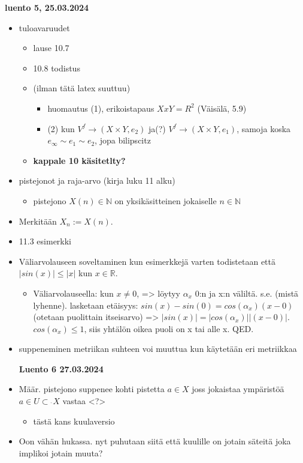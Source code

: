 \documentclass[12pt,a4paper,leqno]{amsart}
\newcommand{\oss}{\operatorname{\subset\!\!\!\!_{^{^\circ}}}}
\begin{document}
\textbf{luento 5, 25.03.2024}
\begin{itemize}
    \item tuloavaruudet
    \begin{itemize}
        \item lause 10.7
        \item 10.8 todistus
    \end{itemize}
    \begin{itemize}
        \item (ilman tätä latex suuttuu)
        \begin{itemize}
            \item huomautus (1), erikoistapaus $X x Y = R^2$ (Väisälä, 5.9)
            \item (2) kun $V^f \rightarrow (X \times Y, e_2)$ ja(?) $V^f \rightarrow (X \times Y, e_1)$, samoja koska $e_\infty \sim e_1 \sim e_2$, jopa bilipscitz
        \end{itemize}
        \item \textbf{kappale 10 käsitetlty?}
    \end{itemize}
    \item pistejonot ja raja-arvo (kirja luku 11 alku)
    \begin{itemize}
        \item pistejono $X(n) \in \mathbb{N}$ on yksikäsitteinen jokaiselle $n \in \mathbb{N}$
    \end{itemize}
    \item Merkitään $X_n := X(n)$.
    \item 11.3 esimerkki 
    \item Väliarvolauseen soveltaminen kun esimerkkejä varten todistetaan että $|sin(x)| \leq |x|$ kun $x \in \mathbb{R}$.
    \begin{itemize}
        \item Väliarvolauseella: kun $x \neq 0$,  => löytyy $\alpha_x$ 0:n ja x:n väliltä. s.e. (mistä lyhenne). lasketaan etäisyys: $sin(x) - sin(0) = cos(\alpha_x)(x - 0)$ (otetaan puolittain itseisarvo) => $|sin(x)| = |cos(\alpha_x)||(x - 0)|$. $cos(\alpha_x) \leq 1$, siis yhtälön oikea puoli on x tai alle x. QED.
    \end{itemize}
    \item suppeneminen metriikan suhteen voi muuttua kun käytetään eri metriikkaa

\textbf{Luento 6 27.03.2024}
\item Määr. pistejono suppenee kohti pistetta $a \in X$ joss jokaistaa ympäristöä $a \in U \oss X$ vastaa <?>
\begin{itemize}
    \item tästä kans kuulaversio
\end{itemize}
\item Oon vähän hukassa. nyt puhutaan siitä että kuulille on jotain säteitä joka implikoi jotain muuta?


\end{itemize}
\end{document}
